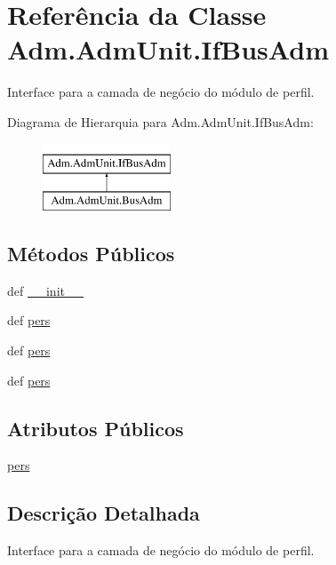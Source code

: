 \hypertarget{classAdm_1_1AdmUnit_1_1IfBusAdm}{\section{Referência da Classe Adm.\-Adm\-Unit.\-If\-Bus\-Adm}
\label{classAdm_1_1AdmUnit_1_1IfBusAdm}
}


Interface para a camada de negócio do módulo de perfil.  


Diagrama de Hierarquia para Adm.\-Adm\-Unit.\-If\-Bus\-Adm\-:\begin{figure}[H]
\begin{center}
\leavevmode
\includegraphics[height=2.000000cm]{d3/d53/classAdm_1_1AdmUnit_1_1IfBusAdm}
\end{center}
\end{figure}
\subsection*{Métodos Públicos}
\begin{DoxyCompactItemize}
\item 
def \hyperlink{classAdm_1_1AdmUnit_1_1IfBusAdm_abe924f0f983b1fe97ca466907d35c834}{\-\_\-\-\_\-init\-\_\-\-\_\-}
\item 
def \hyperlink{classAdm_1_1AdmUnit_1_1IfBusAdm_a31857b146085382c8d778ae90cd46c6f}{pers}
\item 
def \hyperlink{classAdm_1_1AdmUnit_1_1IfBusAdm_a31857b146085382c8d778ae90cd46c6f}{pers}
\item 
def \hyperlink{classAdm_1_1AdmUnit_1_1IfBusAdm_a31857b146085382c8d778ae90cd46c6f}{pers}
\end{DoxyCompactItemize}
\subsection*{Atributos Públicos}
\begin{DoxyCompactItemize}
\item 
\hyperlink{classAdm_1_1AdmUnit_1_1IfBusAdm_a95ea8f39fbbcddf44822e1614c712bfe}{pers}
\end{DoxyCompactItemize}


\subsection{Descrição Detalhada}
Interface para a camada de negócio do módulo de perfil. 

